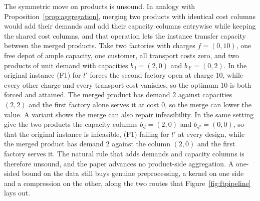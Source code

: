 The symmetric move on products is unsound. In analogy with
Proposition~\ref{prop:aggregation}, merging two products with identical
cost columns would add their demands and add their capacity columns
entrywise while keeping the shared cost columns, and that operation lets
the instance transfer capacity between the merged products. Take two
factories with charges $f=(0,10)$, one free depot of ample
capacity, one customer, all transport costs zero, and two products of unit
demand with capacities $b_{\cdot l}=(2,0)$ and $b_{\cdot l'}=(0,2)$.
In the original instance (F1) for $l'$ forces the second factory open at
charge $10$, while every other charge and every transport cost vanishes, so
the optimum $10$ is both forced and attained. The merged product has
demand $2$ against capacities $(2,2)$ and the
first factory alone serves it at cost $0$, so the merge can lower
the value. A variant shows the merge can also repair infeasibility. In
the same setting give the two products the capacity columns
$b_{\cdot l}=(2,0)$ and $b_{\cdot l'}=(0,0)$, so that the original
instance is infeasible, (F1) failing for $l'$ at every design, while the
merged product has demand $2$ against the column $(2,0)$ and the first
factory serves it. The natural rule that adds demands and capacity
columns is therefore unsound, and the paper advances no product-side
aggregation. A one-sided bound on the data still buys genuine
preprocessing, a kernel on one side and a compression on the other,
along the two routes that
Figure~\ref{fig:ftpipeline} lays out.



